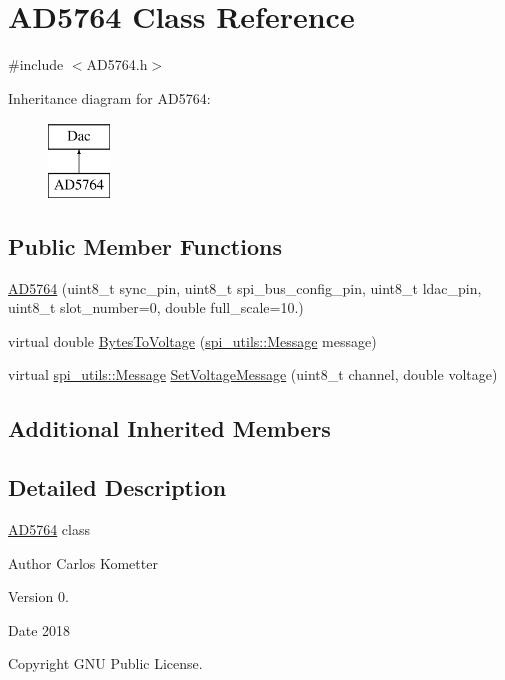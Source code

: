 \hypertarget{classAD5764}{}\section{A\+D5764 Class Reference}
\label{classAD5764}


{\ttfamily \#include $<$A\+D5764.\+h$>$}

Inheritance diagram for A\+D5764\+:\begin{figure}[H]
\begin{center}
\leavevmode
\includegraphics[height=2.000000cm]{classAD5764}
\end{center}
\end{figure}
\subsection*{Public Member Functions}
\begin{DoxyCompactItemize}
\item 
\mbox{\hyperlink{classAD5764_ab8644f724d2f0fbe25f4a181d2e315d6}{A\+D5764}} (uint8\+\_\+t sync\+\_\+pin, uint8\+\_\+t spi\+\_\+bus\+\_\+config\+\_\+pin, uint8\+\_\+t ldac\+\_\+pin, uint8\+\_\+t slot\+\_\+number=0, double full\+\_\+scale=10.)
\item 
virtual double \mbox{\hyperlink{classAD5764_a729015992eda059ae615373d1db53823}{Bytes\+To\+Voltage}} (\mbox{\hyperlink{structspi__utils_1_1Message}{spi\+\_\+utils\+::\+Message}} message)
\item 
virtual \mbox{\hyperlink{structspi__utils_1_1Message}{spi\+\_\+utils\+::\+Message}} \mbox{\hyperlink{classAD5764_a62887ed89fedc4db68f2a54324e1fac0}{Set\+Voltage\+Message}} (uint8\+\_\+t channel, double voltage)
\end{DoxyCompactItemize}
\subsection*{Additional Inherited Members}


\subsection{Detailed Description}
\mbox{\hyperlink{classAD5764}{A\+D5764}} class \begin{DoxyAuthor}{Author}
Carlos Kometter 
\end{DoxyAuthor}
\begin{DoxyVersion}{Version}
0. 
\end{DoxyVersion}
\begin{DoxyDate}{Date}
2018 
\end{DoxyDate}
\begin{DoxyCopyright}{Copyright}
G\+NU Public License. 
\end{DoxyCopyright}



